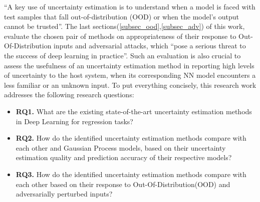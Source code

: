 	\enquote{A key use of uncertainty estimation is to understand when a model is faced with test samples that fall out-of-distribution (OOD) or when the model's output cannot be trusted}\cite{amini2020deep}.
	The last sections(\ref{subsec_ood},\ref{subsec_adv}) of this work, evaluate the chosen pair of methods on appropriateness of their response to Out-Of-Distribution inputs and adversarial attacks, which \enquote{pose a serious threat to the success of deep learning in practice}\cite{akhtar2018threat}. Such an evaluation is also crucial to assess the usefulness of an uncertainty estimation method in reporting high levels of uncertainty to the host system, when its corresponding NN model encounters a less familiar or an unknown input.
	To put everything concisely, this research work addresses the following research questions:
	\begin{itemize}
		\item \textbf{RQ1. }What are the existing state-of-the-art uncertainty estimation
		methods in Deep Learning for regression tasks?
		\item \textbf{RQ2. }How do the identified uncertainty estimation methods compare
		with each other and Gaussian Process models, based on their uncertainty estimation quality and prediction accuracy of their respective models?
		\item \textbf{RQ3. }How do the identified uncertainty estimation methods compare with each other based on their response to Out-Of-Distribution(OOD) and adversarially perturbed inputs?
	\end{itemize}

